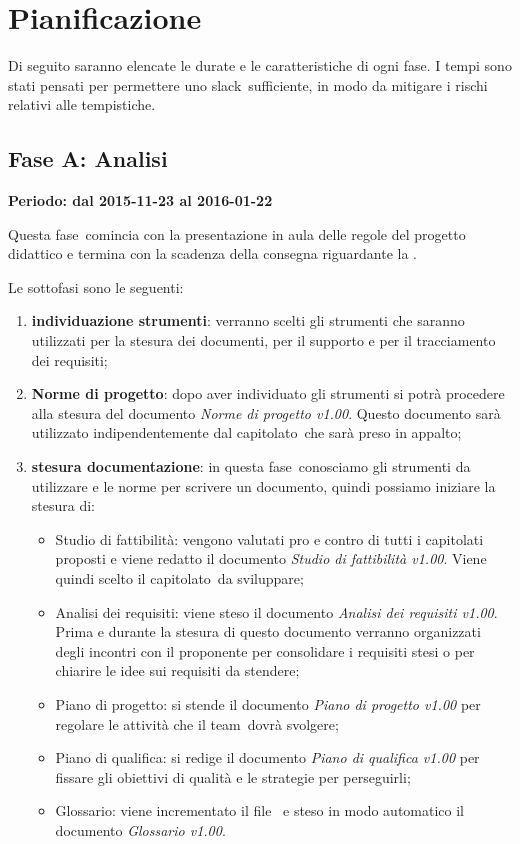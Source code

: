 \documentclass[../PianoProgetto.tex]{subfiles}
\begin{document}
\section{Pianificazione}

	Di seguito saranno elencate le durate e le caratteristiche di ogni fase\g . I tempi sono stati pensati per permettere uno slack\g\ sufficiente, in modo da mitigare i rischi relativi alle tempistiche.
	
	\subsection{Fase A: Analisi}
	
	\textbf{Periodo: dal 2015-11-23 al 2016-01-22}

	Questa fase\g\ comincia con la presentazione in aula delle regole del progetto didattico e termina con la scadenza della consegna riguardante la \revisionedeirequisiti .

	Le sottofasi sono le seguenti:
	\begin{enumerate}
		\item \textbf{individuazione strumenti}: verranno scelti gli strumenti che saranno utilizzati per la stesura dei documenti, per il supporto e per il tracciamento dei requisiti;
		\item \textbf{Norme di progetto}: dopo aver individuato gli strumenti si potrà procedere alla stesura del documento \textit{Norme di progetto v1.00}. Questo documento sarà utilizzato indipendentemente dal capitolato\g\ che sarà preso in appalto;
		\item \textbf{stesura documentazione}: in questa fase\g\ conosciamo gli strumenti da utilizzare e le norme per scrivere un documento, quindi possiamo iniziare la stesura di:
		\begin{itemize}
		\item Studio di fattibilità: vengono valutati pro e contro di tutti i capitolati proposti e viene redatto il documento \textit{Studio di fattibilità v1.00}. Viene quindi scelto il capitolato\g\ da sviluppare;
		\item Analisi dei requisiti: viene steso il documento \textit{Analisi dei requisiti v1.00}. Prima e durante la stesura di questo documento verranno organizzati degli incontri con il proponente per consolidare i requisiti stesi o per chiarire le idee sui requisiti da stendere;
		\item Piano di progetto: si stende il documento \textit{Piano di progetto v1.00} per regolare le attività che il team\g\ dovrà svolgere;
		\item Piano di qualifica: si redige il documento \textit{Piano di qualifica v1.00} per fissare gli obiettivi di qualità e le strategie per perseguirli;
		\item Glossario: viene incrementato il file \glossario\ e steso in modo automatico il documento \textit{Glossario v1.00}.
		\end{itemize}
	\end{enumerate}
		
\end{document}

